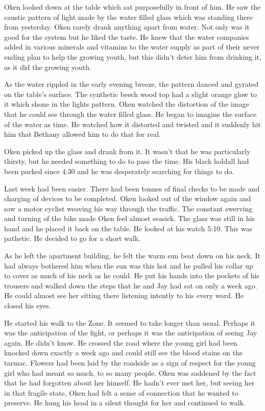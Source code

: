 Oken looked down at the table which sat purposefully in front of him.  He saw the caustic pattern of light made by the water filled glass which was standing there from yesterday.  Oken rarely drank anything apart from water.  Not only was it good for the system but he liked the taste.  He knew that the water companies added in various minerals and vitamins to the water supply as part of their never ending plan to help the growing youth, but this didn't deter him from drinking it, as it did the growing youth.

As the water rippled in the early evening breeze, the pattern danced and gyrated on the table's surface.  The synthetic beech wood top had a slight orange glow to it which shone in the lights pattern.  Oken watched the distortion of the image that he could see through the water filled glass.  He began to imagine the surface of the water as time.  He watched how it distorted and twisted and it suddenly hit him that Bethany allowed him to do that for real.

Oken picked up the glass and drank from it.  It wasn't that he was particularly thirsty, but he needed something to do to pass the time.  His black holdall had been packed since 4:30 and he was desperately searching for things to do.  

Last week had been easier.  There had been tonnes of final checks to be made and charging of devices to be completed.  Oken looked out of the window again and saw a motor cyclist weaving his way through the traffic.  The constant swerving and turning of the bike made Oken feel almost seasick.  The glass was still in his hand and he placed it back on the table.  He looked at his watch 5:10.  This was pathetic.  He decided to go for a short walk.

As he left the apartment building, he felt the warm sun beat down on his neck.  It had always bothered him when the sun was this hot and he pulled his collar up to cover as much of his neck as he could.   He put his hands into the pockets of his trousers and walked down the steps that he and Jay had sat on only a week ago.  He could almost see her sitting there listening intently to his every word.  He closed his eyes.

He started his walk to the Zone.  It seemed to take longer than usual.  Perhaps it was the anticipation of the fight, or perhaps it was the anticipation of seeing Jay again.  He didn't know.  He crossed the road where the young girl had been knocked down exactly a week ago and could still see the blood stains on the tarmac.  Flowers had been laid by the roadside as a sign of respect for the young girl who had meant so much, to so many people.  Oken was saddened by the fact that he had forgotten about her himself.  He hadn't ever met her, but seeing her in that fragile state, Oken had felt a sense of connection that he wanted to preserve.  He hung his head in a silent thought for her and continued to walk.

